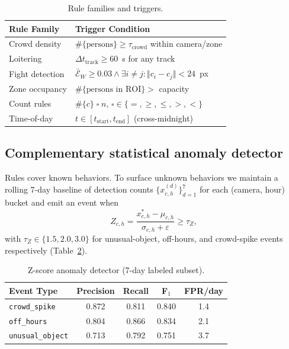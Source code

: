 ﻿\documentclass[conference]{IEEEtran}
\theoremstyle{definition}
\begin{document}
\begin{table}[!t]
\caption{Rule families and triggers.}
\label{tab:alerts}
\centering
\footnotesize
\begin{tabular}{@{}p{2.4cm} p{5.2cm}@{}}
\toprule
Rule Family & Trigger Condition \\
\midrule
Crowd density & $\#\{\text{persons}\} \ge \tau_{\text{crowd}}$ within camera/zone \\
Loitering & $\Delta t_{\text{track}} \ge 60$~s for any track \\
Fight detection & $\bar{\mathcal{E}}_W \ge 0.03 \wedge \exists i\!\neq\!j: \Vert c_i-c_j\Vert<24$~px \\
Zone occupancy & $\#\{\text{persons in ROI}\} > $ capacity \\
Count rules & $\#\{c\} \;\square\; n$, $\square\in\{=,\ge,\le,>,<\}$ \\
Time-of-day & $t \in [t_{\text{start}},t_{\text{end}}]$ (cross-midnight) \\
\bottomrule
\end{tabular}
\end{table}

\subsection{Complementary statistical anomaly detector}
Rules cover known behaviors. To surface unknown behaviors we maintain a rolling 7-day baseline of detection counts $\{x_{c,h}^{(d)}\}_{d=1}^7$ for each (camera, hour) bucket and emit an event when
\begin{equation}
Z_{c,h} = \frac{x_{c,h}^* - \mu_{c,h}}{\sigma_{c,h}+\varepsilon} \ge \tau_Z,
\label{eq:zscore}
\end{equation}
with $\tau_Z\in\{1.5, 2.0, 3.0\}$ for unusual-object, off-hours, and crowd-spike events respectively (Table~\ref{tab:anomaly_results}).

\begin{table}[!t]
\caption{Z-score anomaly detector (7-day labeled subset).}
\label{tab:anomaly_results}
\centering
\footnotesize
\begin{tabular}{@{}lcccc@{}}
\toprule
Event Type & Precision & Recall & F$_1$ & FPR/day \\
\midrule
\texttt{crowd\_spike}    & 0.872 & 0.811 & 0.840 & 1.4 \\
\texttt{off\_hours}      & 0.804 & 0.866 & 0.834 & 2.1 \\
\texttt{unusual\_object} & 0.713 & 0.792 & 0.751 & 3.7 \\
\bottomrule
\end{tabular}
\end{table}
\end{document}
